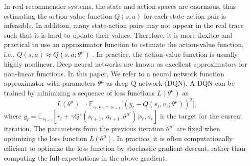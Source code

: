 In real recommender systems, the state and action spaces are enormous, thus estimating the action-value function $Q(s, a)$ for each state-action pair is infeasible. In addition, many state-action pairs may not appear in the real trace such that it is hard to update their values. Therefore, it is more flexible and practical to use an approximator function to estimate the action-value function, i.e., $Q(s,a) \approx Q(s, a; \theta^\mu)$ . In practice, the action-value function is usually highly nonlinear. Deep neural networks are known as excellent approximators for non-linear functions. In this paper, We refer to a neural network function approximator with parameters $\theta^\mu$ as deep $\mathrm{Q}$-network (DQN). A DQN can be trained by minimizing a sequence of loss functions $L(\theta^\mu)$ as
\begin{equation}\label{equ:L}
	L(\theta^\mu)=\mathbb{E}_{s_t, a_t,r_t,s_{t+1}}\big[(y_t-Q(s_t, a_t;\theta^\mu))^{2}\big],
\end{equation}
where $y_t= \mathbb{E}_{s_{t+1}}[r_t+\gamma Q'(s_{t+1},\ a_{t+1};\theta^{\mu'})|s_{t}, a_{t}]$ is the target for the current iteration. The parameters from the previous iteration $\theta^{\mu'}$ are fixed when optimizing the loss function $L(\theta^\mu)$. In practice, it is often computationally efficient to optimize the loss function by stochastic gradient descent, rather than computing the full expectations in the above gradient.





